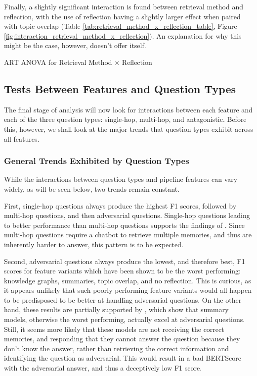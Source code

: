 Finally, a slightly significant interaction is found between retrieval method and reflection, with the use of reflection having a slightly larger effect when paired with topic overlap (Table \ref{tab:retrieval_method_x_reflection_table}, Figure \ref{fig:interaction_retrieval_method_x_reflection}). An explanation for why this might be the case, however, doesn't offer itself.

\begin{table}[htbp]
\centering
\tiny

\caption{ART ANOVA for Retrieval Method × Reflection}
\label{tab:retrieval_method_x_reflection_table}
\end{table}



\subsection{Tests Between Features and Question Types}

The final stage of analysis will now look for interactions between each feature and each of the three question types: single-hop, multi-hop, and antagonistic. Before this, however, we shall look at the major trends that question types exhibit across all features.


\subsubsection{General Trends Exhibited by Question Types}
\label{general_trends_exhibited_by_question_types}

While the interactions between question types and pipeline features can vary widely, as will be seen below, two trends remain constant.

First, single-hop questions always produce the highest F1 scores, followed by multi-hop questions, and then adversarial questions. Single-hop questions leading to better performance than multi-hop questions supports the findings of \cite{Maharana2024}. Since multi-hop questions require a chatbot to retrieve multiple memories, and thus are inherently harder to answer, this pattern is to be expected. 

Second, adversarial questions always produce the lowest, and therefore best, F1 scores for feature variants which have been shown to be the worst performing: knowledge graphs, summaries, topic overlap, and no reflection. This is curious, as it appears unlikely that such poorly performing feature variants would all happen to be predisposed to be better at handling adversarial questions. On the other hand, these results are partially supported by \cite{Maharana2024}, which show that summary models, otherwise the worst performing, actually excel at adversarial questions. Still, it seems more likely that these models are not receiving the correct memories, and responding that they cannot answer the question because they don't know the answer, rather than retrieving the correct information and identifying the question as adversarial. This would result in a bad BERTScore with the adversarial answer, and thus a deceptively low F1 score.


